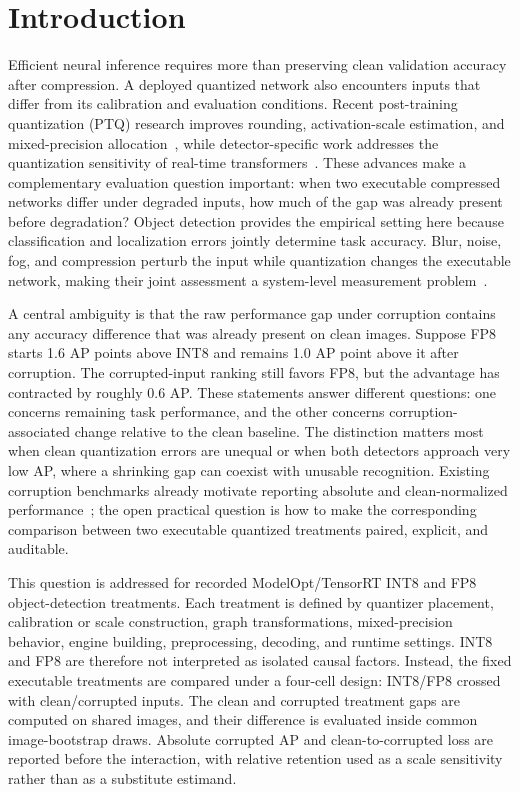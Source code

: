 \documentclass[a4paper,fleqn]{cas-dc}
\begin{document}
\section{Introduction}
\label{sec:introduction}

Efficient neural inference requires more than preserving clean validation accuracy after compression. A deployed quantized network also encounters inputs that differ from its calibration and evaluation conditions. Recent post-training quantization (PTQ) research improves rounding, activation-scale estimation, and mixed-precision allocation~\citep{diao2024attentionround,hao2024stabilized,feng2025plmq}, while detector-specific work addresses the quantization sensitivity of real-time transformers~\citep{huo2026qrt}. These advances make a complementary evaluation question important: when two executable compressed networks differ under degraded inputs, how much of the gap was already present before degradation? Object detection provides the empirical setting here because classification and localization errors jointly determine task accuracy. Blur, noise, fog, and compression perturb the input while quantization changes the executable network, making their joint assessment a system-level measurement problem~\citep{thacker2008performance,wen2020uadetrac}.

A central ambiguity is that the raw performance gap under corruption contains any accuracy difference that was already present on clean images. Suppose FP8 starts 1.6 AP points above INT8 and remains 1.0 AP point above it after corruption. The corrupted-input ranking still favors FP8, but the advantage has contracted by roughly 0.6 AP. These statements answer different questions: one concerns remaining task performance, and the other concerns corruption-associated change relative to the clean baseline. The distinction matters most when clean quantization errors are unequal or when both detectors approach very low AP, where a shrinking gap can coexist with unusable recognition. Existing corruption benchmarks already motivate reporting absolute and clean-normalized performance~\citep{michaelis2019detectorrobustness}; the open practical question is how to make the corresponding comparison between two executable quantized treatments paired, explicit, and auditable.

This question is addressed for recorded ModelOpt/TensorRT INT8 and FP8 object-detection treatments. Each treatment is defined by quantizer placement, calibration or scale construction, graph transformations, mixed-precision behavior, engine building, preprocessing, decoding, and runtime settings. INT8 and FP8 are therefore not interpreted as isolated causal factors. Instead, the fixed executable treatments are compared under a four-cell design: INT8/FP8 crossed with clean/corrupted inputs. The clean and corrupted treatment gaps are computed on shared images, and their difference is evaluated inside common image-bootstrap draws. Absolute corrupted AP and clean-to-corrupted loss are reported before the interaction, with relative retention used as a scale sensitivity rather than as a substitute estimand.
\end{document}
